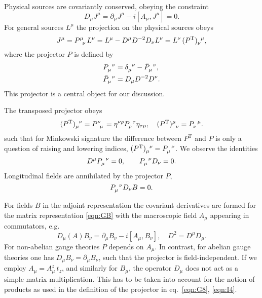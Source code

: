 \documentclass[twocolumn,aps,prd,amsmath,amssymb,preprintnumbers,longbibliography]{revtex4-1}
\numberwithin{equation}{section}
\newcommand{\transp}{\mathrm{T}}
\newenvironment{alignedeqn}{\begin{equation}\begin{aligned}}{\end{aligned}\end{equation}\ignorespacesafterend}
\begin{document}
Physical sources are covariantly conserved, obeying the constraint
\begin{equation}\label{eqn:G9}
	D_\mu J^\mu
	= \partial_\mu J^\mu - i [A_\mu,J^\mu]
	= 0.
\end{equation}
For general sources $L^\mu$ the projection on the physical sources obeys
\begin{equation}\label{eqn:G8}
	J^\mu
	= \tensor{P}{^\mu_\nu} L^\nu
	= L^\mu - D^\mu D^{-2} D_\nu L^\nu
	= L^\nu \, \tensor{(P^\transp)}{_\nu^\mu},
\end{equation}
where the projector $P$ is defined by
\begin{alignedeqn}\label{eqn:I4}
	&\tensor{P}{_\mu^\nu}
	= \tensor{\delta}{_\mu^\nu} - \tensor{\bar{P}}{_\mu^\nu},\\
	&\tensor{\bar{P}}{_\mu^\nu}
	= D_\mu D^{-2} D^\nu.
\end{alignedeqn}
This projector is a central object for our discussion.

The transposed projector obeys
\begin{equation}\label{eqn:228B}
	\tensor{(P^\transp)}{_\mu^\nu}
	= \tensor{P}{^\nu_\mu}
	= \eta^{\nu\rho} \tensor{P}{_\rho^\tau} \eta_{\tau\mu},
	\quad
	\tensor{(P^\transp)}{^\mu_\nu}
	= \tensor{P}{_\nu^\mu}.
\end{equation}
such that for Minkowski signature the difference between $P^\transp$ and $P$ is only a question of raising and lowering indices, $\tensor{(P^\transp)}{_\mu^\nu} = \tensor{P}{_\mu^\nu}$. We observe the identities
\begin{equation}
	D^\mu \tensor{P}{_\mu^\nu}
	= 0,
	\qquad
	\tensor{P}{_\mu^\nu} D_\nu
	= 0.
\end{equation}
Longitudinal fields are annihilated by the projector $P$,
\begin{equation}\label{eqn:G7}
	\tensor{P}{_\mu^\nu} D_\nu B
	= 0.
\end{equation}

For fields $B$ in the adjoint representation the covariant derivatives are formed for the matrix representation \eqref{eqn:GB} with the macroscopic field $A_\mu$ appearing in commutators, e.g.
\begin{equation}\label{eqn:225A}
	D_\mu(A) B_\nu
	= \partial_\mu B_\nu - i [A_\mu,B_\nu],
	\quad
	D^2 = D^\mu D_\mu.
\end{equation}
For non-abelian gauge theories $P$ depends on $A_\mu$. In contrast, for abelian gauge theories one has $D_\mu B_\nu =\partial_\mu B_\nu$, such that the projector is field-independent. If we employ $A_\mu = A_\mu^z \, t_z$, and similarly for $B_\mu$, the operator $D_\mu$ does not act as a simple matrix multiplication. This has to be taken into account for the notion of products as used in the definition of the projector in eq.~\eqref{eqn:G8}, \eqref{eqn:I4}.
\end{document}
